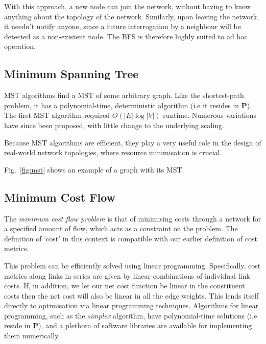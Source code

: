 \documentclass[aps,rmp,twocolumn,amsmath,amssymb,nofootinbib,superscriptaddress]{revtex4}
\begin{document}
With this approach, a new node can join the network, without having to know anything about the topology of the network. Similarly, upon leaving the network, it needn't notify anyone, since a future interrogation by a neighbour will be detected as a non-existent node. The BFS is therefore highly suited to ad hoc operation.

%
%

\subsection{Minimum Spanning Tree} \label{sec:min_tree}

MST algorithms find a MST of some arbitrary graph. Like the shortest-path problem, it has a polynomial-time, deterministic algorithm (i.e it resides in \textbf{P}). The first MST algorithm \cite{bib:Boruvka26} required $O(|E|\log |V|)$ runtime. Numerous variations have since been proposed, with little change to the underlying scaling.

Because MST algorithms are efficient, they play a very useful role in the design of real-world network topologies, where resource minimisation is crucial.

Fig.~\ref{fig:mst} shows an example of a graph with its MST.

%
%

\subsection{Minimum Cost Flow} \label{sec:min_cost_flow_prob}

The \emph{minimum cost flow problem} \cite{???} is that of minimising costs through a network for a specified amount of flow, which acts as a constraint on the problem. The definition of `cost' in this context is compatible with our earlier definition of cost metrics.

This problem can be efficiently solved using linear programming. Specifically, cost metrics along links in series are given by linear combinations of individual link costs. If, in addition, we let our net cost function be linear in the constituent costs then the net cost will also be linear in all the edge weights. This lends itself directly to optimisation via linear programming techniques. Algorithms for linear programming, such as the \emph{simplex} algorithm, have polynomial-time solutions (i.e reside in \textbf{P}), and a plethora of software libraries are available for implementing them numerically.
\end{document}
